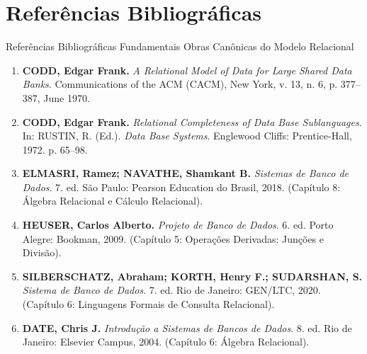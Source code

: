 \section[Referências]{Referências Bibliográficas}

\begin{frame}{Referências Bibliográficas Fundamentais}
  \alert{Obras Canônicas do Modelo Relacional}\par
  \vspace{0.3cm}
  \scriptsize
  \begin{enumerate}
    \item \textbf{CODD, Edgar Frank.} \emph{A Relational Model of Data for Large Shared Data Banks}. Communications of the ACM (CACM), New York, v. 13, n. 6, p. 377–387, June 1970.
    \item \textbf{CODD, Edgar Frank.} \emph{Relational Completeness of Data Base Sublanguages}. In: RUSTIN, R. (Ed.). \emph{Data Base Systems}. Englewood Cliffs: Prentice-Hall, 1972. p. 65–98.
    \item \textbf{ELMASRI, Ramez; NAVATHE, Shamkant B.} \emph{Sistemas de Banco de Dados}. 7. ed. São Paulo: Pearson Education do Brasil, 2018. (Capítulo 8: Álgebra Relacional e Cálculo Relacional).
    \item \textbf{HEUSER, Carlos Alberto.} \emph{Projeto de Banco de Dados}. 6. ed. Porto Alegre: Bookman, 2009. (Capítulo 5: Operações Derivadas: Junções e Divisão).
    \item \textbf{SILBERSCHATZ, Abraham; KORTH, Henry F.; SUDARSHAN, S.} \emph{Sistema de Banco de Dados}. 7. ed. Rio de Janeiro: GEN/LTC, 2020. (Capítulo 6: Linguagens Formais de Consulta Relacional).
    \item \textbf{DATE, Chris J.} \emph{Introdução a Sistemas de Bancos de Dados}. 8. ed. Rio de Janeiro: Elsevier Campus, 2004. (Capítulo 6: Álgebra Relacional).
  \end{enumerate}
\end{frame}
